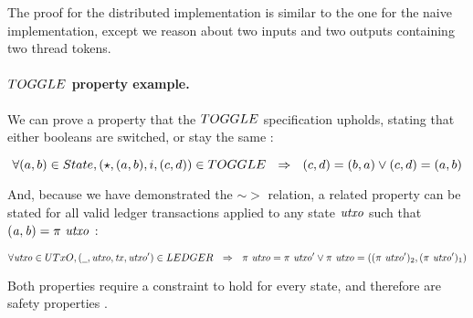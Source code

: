 The proof for the distributed implementation is similar to the one for the
naive implementation, except we reason about two inputs and two outputs
containing two thread tokens.

\paragraph{$\TOGGLE$ property example. }
We can prove a property that the $\TOGGLE$ specification upholds, stating that
either booleans are switched, or stay the same :

\[ \forall (a, b) \in \State, (\emptytype, (a,b), i, (c, d)) \in \TOGGLE ~~\Rightarrow~~
(c, d) = (b, a) \vee (c, d) = (a, b) \]

And, because we have demonstrated the $\sim >$ relation, a related property can be
stated for all valid ledger transactions applied to
any state $\mathit{utxo}$ such that $\mathit{(a, b)} = \pi ~\mathit{utxo}$ :

\[ \forall \var{utxo} \in \UTxO, (\wcard, \var{utxo}, \var{tx}, \var{utxo'}) \in \LEDGER ~~\Rightarrow~~
\pi~\var{utxo} = \pi~\var{utxo'} \vee \pi~\var{utxo} = ((\pi~\var{utxo'})_2, (\pi~\var{utxo'})_1) \]

Both properties require a constraint to hold for every state, and therefore
are safety properties \cite{liveness}.

%


